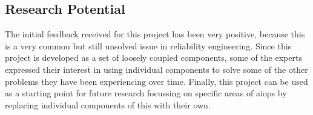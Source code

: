 \subsection{Research Potential}

The initial feedback received for this project has been very positive, because this is a very common but still unsolved issue in reliability engineering. Since this project is developed as a set of loosely coupled components, some of the experts expressed their interest in using individual components to solve some of the other problems they have been experiencing over time. Finally, this project can be used as a starting point for future research focussing on specific areas of \ac{aiops} by replacing individual components of this with their own.